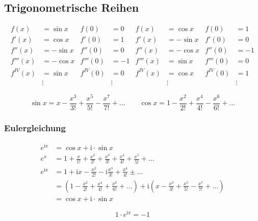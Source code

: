 \subsection{Trigonometrische Reihen}

\begin{align*}
    f(x) &=\sin x & f(0) &=0 & f(x) &= \cos x & f(0) &= 1 \\
    f'(x) &=\cos x & f'(0) &=1 & f'(x) &= -\sin x & f'(0) &= 0 \\
    f''(x) &=-\sin x & f''(0) &=0 & f''(x) &= -\cos x & f''(0) &= -1 \\
    f'''(x) &=-\cos x & f'''(0) &=-1 & f'''(x) &= \sin x & f'''(0) &= 0 \\
    f^{IV}(x) &=\sin x & f^{IV}(0) &=0 & f^{IV}(x) &= \cos x & f^{IV}(0) &= 1 \\
    &\vdots & &\vdots & &\vdots & &\vdots 
\end{align*}

\[
    \sin x = x - \frac{x^3}{3!} + \frac{x^5}{5!} - \frac{x^7}{7!} + \ldots \qquad
    \cos x = 1 - \frac{x^2}{2!} + \frac{x^4}{4!} - \frac{x^6}{6!} + \ldots  
\]

\subsubsection{Eulergleichung}

\begin{align*}
    e^{\mathrm{i}x} &= \cos x + \mathrm{i} \cdot \sin x \\
    e^x &= 1 + \frac{x}{1!} + \frac{x^2}{2!} + \frac{x^3}{3!} + \frac{x^4}{4!}  + \frac{x^5}{5!} + \ldots \\
    e^{\mathrm{i}x} &= 1 + \mathrm{i} x - \frac{x^2}{2!} - \mathrm{i} \frac{x^3}{3!} + \frac{x^4}{4!} \pm \ldots \\
    &= \left( 1 - \frac{x^2}{2!} + \frac{x^4}{4!} + \frac{x^6}{6!} + \ldots \right) + \mathrm{i} \left( x - \frac{x^3}{3!} + \frac{x^5}{5!} - \frac{x^7}{7!} + \ldots \right) \\
    &= \cos x + \mathrm{i} \cdot \sin x
\end{align*}

\begin{gesetz}
    \[
        1 \cdot e^{\mathrm{i} \pi} = -1
    \]
\end{gesetz}
